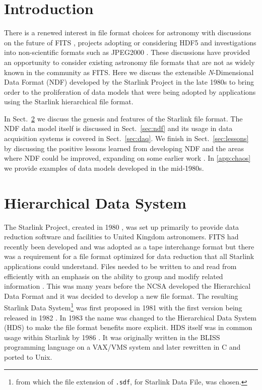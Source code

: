 \documentclass[final,authoryear,5p,times,twocolumn]{elsarticle}
\newcommand*\secref[1]{Sect.~\ref{#1}}
\begin{document}
\section{Introduction}
\label{sec:intro}

There is a renewed interest in file format choices for astronomy
with discussions on the future of FITS
\citep{P90_adassxxiii,2014Thomas}, projects adopting or considering
HDF5 \citep{2012ASPC..461..283A,P10_adassxxiii} and investigations into
non-scientific formats such as JPEG2000 \citep{2014Kitaeff}. These
discussions have provided an opportunity to consider existing
astronomy file formats that are not as widely known in the community
as FITS. Here we discuss the extensible \emph{N}-Dimensional
Data Format (NDF) developed by the Starlink Project
\citep{1982MmSAI..53...55T,2000ASSL..250...93W} in the late 1980s
\citep{1988STARB...2...11C,SGP38} to bring order to the proliferation
of data models that were being adopted by applications using the Starlink
hierarchical file format.

In \secref{sec:hds} we discuss the genesis and features of the Starlink
file format. The NDF data model itself is
discussed in \secref{sec:ndf} and its usage in data acquisition
systems is covered in \secref{sec:daq}. We finish in
\secref{sec:lessons} by discussing the positive lessons learned from
developing NDF and the areas where NDF could be improved, expanding on
some earlier work \citep{P91_adassxxiii}. In \ref{app:chaos} we
provide examples of data models developed in the mid-1980s.

\section{Hierarchical Data System}
\label{sec:hds}

The Starlink Project, created in 1980
\citep{1980IrAJ...14..197E,1982MmSAI..53...55T}, was set up
primarily to provide data reduction software and facilities to United
Kingdom astronomers. FITS
\citep{1979ipia.coll..445W,1981A&AS...44..363W} had recently been
developed and was adopted as a tape interchange format but there was a
requirement for a file format optimized for data reduction that all
Starlink applications could understand. Files
needed to be written to and read from efficiently with an emphasis on the
ability to group and modify related information
\citep{1981STARENT4}. This was many years before the NCSA developed
the Hierarchical Data Format \citep{HDF1,Folk2010} and it was decided
to develop a new file format. The resulting Starlink Data
System\footnote{from which the file extension of \texttt{.sdf}, for
  Starlink Data File, was chosen.} was first proposed in 1981 with the
first version being released in 1982 \citep[see
e.g.][]{1982QJRAS..23..485D,1991STARB...8....2L}. In 1983 the name was
changed to the Hierarchical Data System (HDS) to make the file format
benefits more explicit. HDS itself was in common usage within Starlink by 1986
\citep{1986BICDS..30...13L}. It was originally written in the BLISS
programming language on a VAX/VMS system and later rewritten in C and
ported to Unix.
\end{document}

